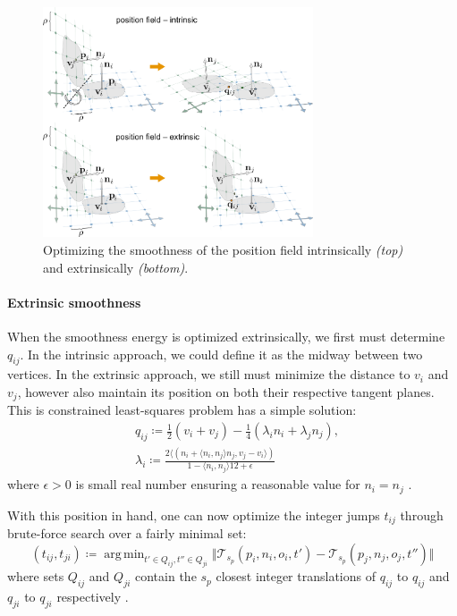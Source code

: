 \documentclass{ACGSeminar}
\DeclareMathOperator*{\argmin}{arg\,min}
\begin{document}
\begin{figure}[htb!]
	\begin{centering}
		\includegraphics[width=8cm]{img/position-field-intrinsic-extrinsic.png}\par
	\end{centering}
	\caption{Optimizing the smoothness of the position field intrinsically \textit{(top)} and extrinsically \textit{(bottom)}. \cite{jakob2015instant}}
	\label{fig:position-field-intrinsic-extrinsic}
\end{figure}

\paragraph{Extrinsic smoothness}
When the smoothness energy is optimized extrinsically, we first must determine $q_{ij}$. In the intrinsic approach, we could define it as the midway between two vertices. In the extrinsic approach, we still must minimize the distance to $v_i$ and $v_j$, however also maintain its position on both their respective tangent planes. This is constrained least-squares problem has a simple solution:
\begin{equation*}
\begin{split}
	& q_{ij} \coloneqq \frac{1}{2}(v_i + v_j) - \frac{1}{4}(\lambda_i n_i + \lambda_j n_j),\\
	& \lambda_i \coloneqq \frac{2 \langle (n_i + \langle n_i, n_j \rangle n_j, v_j - v_i \rangle)}{1 - \langle n_i, n_j \rangle 12 + \epsilon}
\end{split}
\end{equation*}
where $\epsilon > 0$ is small real number ensuring a reasonable value for $n_i = n_j$ \cite{jakob2015instant}.\bigskip

With this position in hand, one can now optimize the integer jumps $t_{ij}$ through brute-force search over a fairly minimal set:
\begin{equation*}
	(t_{ij}, t_{ji}) \coloneqq \argmin_{t' \in Q_{ij}, t'' \in Q_{ji}} \Vert \mathcal{T}_{s_p}(p_i, n_i, o_i, t') - \mathcal{T}_{s_p}(p_j, n_j, o_j, t'') \Vert
\end{equation*}
where sets $Q_{ij}$ and $Q_{ji}$ contain the $s_p$ closest integer translations of $q_{ij}$ to $q_{ij}$ and $q_{ji}$ to $q_{ji}$ respectively \cite{jakob2015instant}.\bigskip
\end{document}
